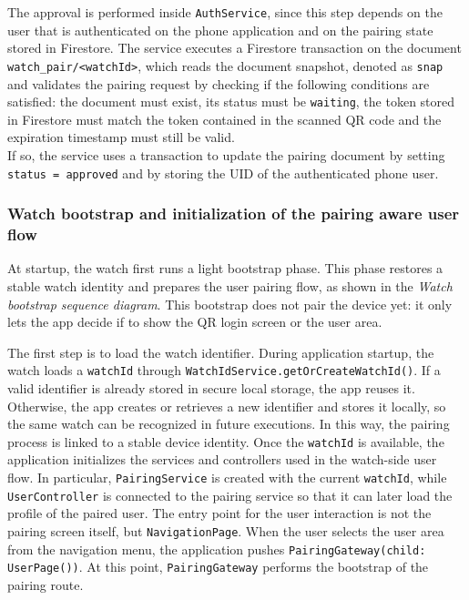The approval is performed inside \texttt{AuthService}, since this step depends on the user that is authenticated on the phone application and on the pairing state stored in Firestore. The service executes a Firestore transaction on the document \texttt{watch\_pair/<watchId>}, which reads the document snapshot, denoted as \texttt{snap} and validates the pairing request by checking if the following conditions are satisfied: the document must exist, its status must be \texttt{waiting}, the token stored in Firestore must match the token contained in the scanned QR code and the expiration timestamp must still be valid. \\
If so, the service uses a transaction to update the pairing document by setting \texttt{status = approved} and by storing the UID of the authenticated phone user.  \\











\subsubsection{Watch bootstrap and initialization of the pairing aware user flow}
At startup, the watch first runs a light bootstrap phase. This phase restores a stable watch identity and prepares the user pairing flow, as shown in the  \textit{Watch bootstrap sequence diagram}. This bootstrap does not pair the device yet: it only lets the app decide if to show the QR login screen or the user area.

The first step is to load the watch identifier. During application startup, the watch loads a \texttt{watchId} through \texttt{WatchIdService.getOrCreateWatchId()}. If a valid identifier is already stored in secure local storage, the app reuses it. Otherwise, the app creates or retrieves a new identifier and stores it locally, so the same watch can be recognized in future executions. In this way, the pairing process is linked to a stable device identity.
Once the \texttt{watchId} is available, the application initializes the services and controllers used in the watch-side user flow. In particular, \texttt{PairingService} is created with the current \texttt{watchId}, while \texttt{UserController} is connected to the pairing service so that it can later load the profile of the paired user. The entry point for the user interaction is not the pairing screen itself, but \texttt{NavigationPage}. When the user selects the user area from the navigation menu, the application pushes \texttt{PairingGateway(child: UserPage())}.
At this point, \texttt{PairingGateway} performs the bootstrap of the pairing route.






